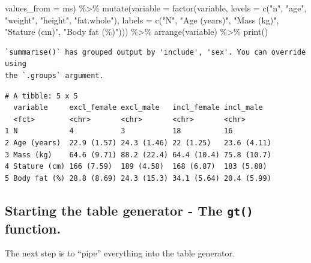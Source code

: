 \documentclass[
  11pt,
  letterpaper,
]{scrbook}
\newenvironment{Shaded}{\begin{snugshade}}{\end{snugshade}}
\newcommand{\AttributeTok}[1]{\textcolor[rgb]{0.40,0.45,0.13}{#1}}
\newcommand{\FunctionTok}[1]{\textcolor[rgb]{0.28,0.35,0.67}{#1}}
\newcommand{\NormalTok}[1]{\textcolor[rgb]{0.00,0.23,0.31}{#1}}
\newcommand{\SpecialCharTok}[1]{\textcolor[rgb]{0.37,0.37,0.37}{#1}}
\newcommand{\StringTok}[1]{\textcolor[rgb]{0.13,0.47,0.30}{#1}}
\begin{document}
\begin{Shaded}
\begin{Highlighting}[numbers=left,,]
              \AttributeTok{values\_from =}\NormalTok{ ms) }\SpecialCharTok{\%\textgreater{}\%}
    \FunctionTok{mutate}\NormalTok{(}\AttributeTok{variable =} \FunctionTok{factor}\NormalTok{(variable, }\AttributeTok{levels =} \FunctionTok{c}\NormalTok{(}\StringTok{"n"}\NormalTok{, }\StringTok{"age"}\NormalTok{, }\StringTok{"weight"}\NormalTok{, }\StringTok{"height"}\NormalTok{, }\StringTok{"fat.whole"}\NormalTok{), }
                           \AttributeTok{labels =} \FunctionTok{c}\NormalTok{(}\StringTok{"N"}\NormalTok{, }\StringTok{"Age (years)"}\NormalTok{, }\StringTok{"Mass (kg)"}\NormalTok{, }
                                      \StringTok{"Stature (cm)"}\NormalTok{, }\StringTok{"Body fat (\%)"}\NormalTok{))) }\SpecialCharTok{\%\textgreater{}\%}
  \FunctionTok{arrange}\NormalTok{(variable) }\SpecialCharTok{\%\textgreater{}\%}
  \FunctionTok{print}\NormalTok{()}
\end{Highlighting}
\end{Shaded}

\begin{verbatim}
`summarise()` has grouped output by 'include', 'sex'. You can override using
the `.groups` argument.
\end{verbatim}

\begin{verbatim}
# A tibble: 5 x 5
  variable     excl_female excl_male   incl_female incl_male  
  <fct>        <chr>       <chr>       <chr>       <chr>      
1 N            4           3           18          16         
2 Age (years)  22.9 (1.57) 24.3 (1.46) 22 (1.25)   23.6 (4.11)
3 Mass (kg)    64.6 (9.71) 88.2 (22.4) 64.4 (10.4) 75.8 (10.7)
4 Stature (cm) 166 (7.59)  189 (4.58)  168 (6.87)  183 (5.88) 
5 Body fat (%) 28.8 (8.69) 24.3 (15.3) 34.1 (5.64) 20.4 (5.99)
\end{verbatim}

\hypertarget{starting-the-table-generator---the-gt-function.}{%
\subsection{\texorpdfstring{Starting the table generator - The
\texttt{gt()}
function.}{Starting the table generator - The gt() function.}}\label{starting-the-table-generator---the-gt-function.}}

The next step is to ``pipe'' everything into the table generator.
\end{document}
